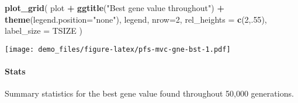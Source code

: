 \documentclass[]{book}
\newenvironment{Shaded}{\begin{snugshade}}{\end{snugshade}}
\newcommand{\DataTypeTok}[1]{\textcolor[rgb]{0.13,0.29,0.53}{#1}}
\newcommand{\DecValTok}[1]{\textcolor[rgb]{0.00,0.00,0.81}{#1}}
\newcommand{\FloatTok}[1]{\textcolor[rgb]{0.00,0.00,0.81}{#1}}
\newcommand{\KeywordTok}[1]{\textcolor[rgb]{0.13,0.29,0.53}{\textbf{#1}}}
\newcommand{\NormalTok}[1]{#1}
\newcommand{\OperatorTok}[1]{\textcolor[rgb]{0.81,0.36,0.00}{\textbf{#1}}}
\newcommand{\OtherTok}[1]{\textcolor[rgb]{0.56,0.35,0.01}{#1}}
\newcommand{\StringTok}[1]{\textcolor[rgb]{0.31,0.60,0.02}{#1}}
\let\oldparagraph\paragraph
\renewcommand{\paragraph}[1]{\oldparagraph{#1}\mbox{}}
\begin{document}
\begin{Shaded}
\begin{Highlighting}[]
\KeywordTok{plot_grid}\NormalTok{(}
\NormalTok{  plot }\OperatorTok{+}
\StringTok{    }\KeywordTok{ggtitle}\NormalTok{(}\StringTok{"Best gene value throughout"}\NormalTok{) }\OperatorTok{+}
\StringTok{    }\KeywordTok{theme}\NormalTok{(}\DataTypeTok{legend.position=}\StringTok{"none"}\NormalTok{),}
\NormalTok{  legend,}
  \DataTypeTok{nrow=}\DecValTok{2}\NormalTok{,}
  \DataTypeTok{rel_heights =} \KeywordTok{c}\NormalTok{(}\DecValTok{2}\NormalTok{,.}\DecValTok{55}\NormalTok{),}
  \DataTypeTok{label_size =}\NormalTok{ TSIZE}
\NormalTok{)}
\end{Highlighting}
\end{Shaded}

\texttt{[image: demo\_files/figure-latex/pfs-mvc-gne-bst-1.pdf]}

\hypertarget{stats-63}{%
\paragraph{Stats}\label{stats-63}}

Summary statistics for the best gene value found throughout 50,000 generations.

\begin{Shaded}
\end{Shaded}
\end{document}
